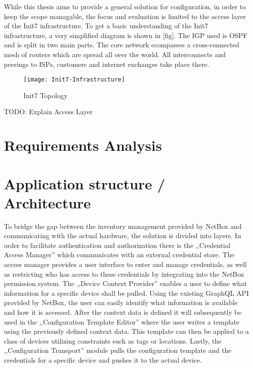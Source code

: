While this thesis aims to provide a general solution for configuration, in order to keep the scope managable, the focus
and evaluation is limited to the access layer of the Init7 infrastructure.
To get a basic understanding of the Init7 infrastructure, a very simplified diagram is shown in [fig]. The \acrfull{IGP} used is
\acrshort{OSPF} and is split in two main parts. The core network ecompasses a cross-connected mesh of routers which are spread all
over the world. All interconnects and peerings to ISPs, customers and internet exchanges take place there. 

\begin{figure}[h]
  \centering
  \texttt{[image: Init7-Infrastructure]}
  \caption{Init7 Topology}
  \label{fig:topology}
\end{figure}

TODO: Explain Access Layer


\section{Requirements Analysis}

\section{Application structure / Architecture}

To bridge the gap between the inventory management provided by NetBox and communicating with the actual hardware,
the solution is divided into layers.
In order to facilitate authentication and authorization there is the ,,Credential Access Manager'' which communicates
with an external credential store. The access manager provides a user interface to enter and manage credentials, as well
as restricting who has access to these credentials by integrating into the NetBox permission system.
The ,,Device Context Provider'' enables a user to define what information for a specific device shall be pulled.
Using the existing GraphQL API provided by NetBox, the user can easily identify what information is available and how it is
accessed. After the context data is defined it will subsequently be used in the ,,Configuration Template Editor''
where the user writes a template using the previously defined context data. This template can then be applied to
a class of devices utilizing constraints such as tags or locations.
Lastly, the ,,Configuration Transport'' module pulls the configuration template and the credentials for a specific device
and pushes it to the actual device.

